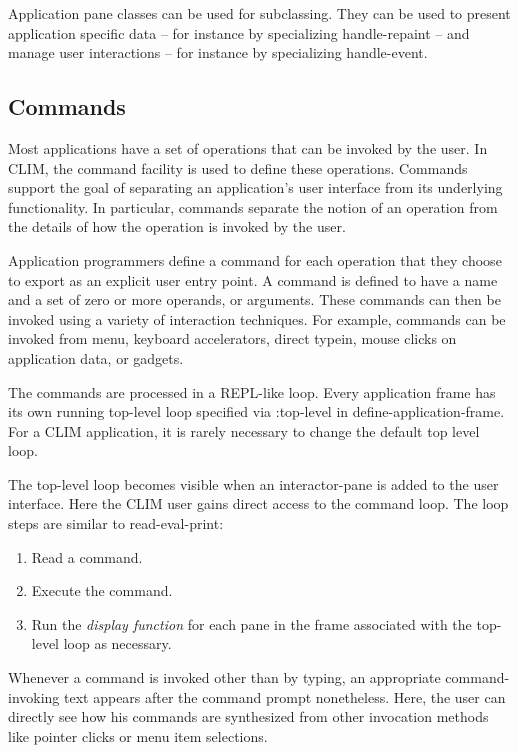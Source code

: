\documentclass[twocolumn,a4paper]{article}
\newcommand {\concept} [1] {{\sl #1}\index{#1}}
\newcommand {\code}[1]{{\sffamily #1}}
\newcommand {\CLIM}{{\small CLIM}}
\let\method\code
\let\keyword\code
\begin{document}
Application pane classes can be used for subclassing. They can be used to present application specific data -- for instance by specializing \method{handle-repaint} -- and manage user interactions -- for instance by specializing \method{handle-event}.

\subsection{Commands} 

Most applications have a set of operations that can be invoked by the user. In \CLIM{}, the command facility is used to define these operations. Commands support the goal of separating an application's user interface from its underlying functionality.  In particular, commands separate the notion of an operation from the details of how the operation is invoked by the user.

Application programmers define a command for each operation that they choose to export as an explicit user entry point. A command is defined to have a name and a set of zero or more operands, or arguments. These commands can then be invoked using a variety of interaction techniques. For example, commands can be invoked from menu, keyboard accelerators, direct typein, mouse clicks on application data, or gadgets. 

The commands are processed in a REPL-like loop. Every application frame has its own running top-level loop specified via \keyword{:top-level} in \method{define-application-frame}. For a \CLIM{} application, it is rarely necessary to change the default top level loop.

The top-level loop becomes visible when an interactor-pane is added to the user interface. Here the \CLIM{} user gains direct access to the command loop. The loop steps are similar to read-eval-print:

\begin{enumerate}
\item Read a command.
\item Execute the command.
\item Run the \concept{display function} for each pane in the frame associated with the top-level loop as necessary.
\end{enumerate}

Whenever a command is invoked other than by typing, an appropriate command-invoking text appears after the command prompt nonetheless. Here, the user can directly see how his commands are synthesized from other invocation methods like pointer clicks or menu item selections.
\end{document}
